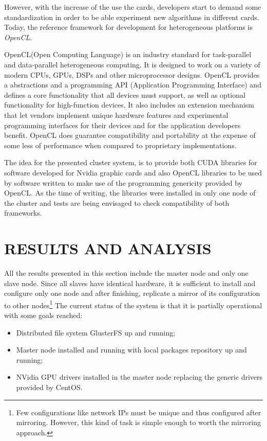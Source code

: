 \documentclass[twoside,a4paper,12pt,english]{inac17}
\begin{document}
However, with the increase of the use the cards, developers start to demand some
standardization in order to be able experiment new algorithms in different cards. Today, the
reference framework for development for heterogeneous platforms is \textit{OpenCL}\cite{opencl}.

OpenCL\texttrademark (Open Computing Language) is an industry standard for task-parallel and
data-parallel heterogeneous computing. It is designed to work on a variety of modern
CPUs, GPUs, DSPs and other microprocessor designs. OpenCL provides a abstractions and a
programming API (Application Programming Interface) and defines a core functionality that all
devices must support, as well as optional functionality for high-function devices. It also
includes an extension mechanism that let vendors implement unique hardware features and
experimental programming interfaces for their devices and for the application developers
benefit. OpenCL does guarantee compatibility and portability at the expense of some less
of performance when compared to proprietary implementations.

The idea for the presented cluster system, is to provide both CUDA libraries for
software developed for Nvidia graphic cards and also OpenCL libraries to
be used by software written to make use of the programming genericity
provided by OpenCL. As the time of writing, the libraries were installed
in only one node of the cluster and tests are being envisaged to check
compatibility of both frameworks.


\section{RESULTS AND ANALYSIS}

All the results presented in this section include the master node and only one slave node.
Since all slaves have identical hardware, it is sufficient to install and configure only one
node and after finishing, replicate a mirror of its configuration to other nodes\footnote{Few configurations like
  network IPs must be unique and thus configured after mirroring. However, this kind of task is simple enough to worth the mirroring approach.}
The current status of the system is that it is partially operational with some goals reached:

\begin{itemize}

\item Distributed file system GlusterFS up and running;
\item Master node installed and running with local packages repository up and running;
\item NVidia GPU drivers installed in the master node replacing the generic drivers provided by CentOS.
  
\end{itemize}
\end{document}
